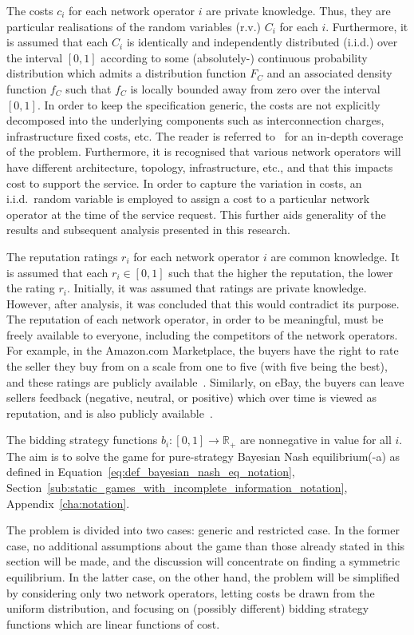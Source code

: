 The costs $c_i$ for each network operator $i$ are private knowledge. Thus, they are particular realisations of the random variables (r.v.) $C_i$ for each $i$. Furthermore, it is assumed that each $C_i$ is identically and independently distributed (i.i.d.) over the interval $[0,1]$ according to some (absolutely-) continuous probability distribution which admits a distribution function $F_{C}$ and an associated density function $f_{C}$ such that $f_C$ is locally bounded away from zero over the interval $[0,1]$. In order to keep the specification generic, the costs are not explicitly decomposed into the underlying components such as interconnection charges, infrastructure fixed costs, etc. The reader is referred to~\cite{Njoroge2009,LeCadre2009,HauBrenner2009} for an in-depth coverage of the problem. Furthermore, it is recognised that various network operators will have different architecture, topology, infrastructure, etc., and that this impacts cost to support the service. In order to capture the variation in costs, an i.i.d.~random variable is employed to assign a cost to a particular network operator at the time of the service request. This further aids generality of the results and subsequent analysis presented in this research.

The reputation ratings $r_i$ for each network operator $i$ are common knowledge. It is assumed that each $r_i\in [0,1]$ such that the higher the reputation, the lower the rating $r_i$. Initially, it was assumed that ratings are private knowledge. However, after analysis, it was concluded that this would contradict its purpose. The reputation of each network operator, in order to be meaningful, must be freely available to everyone, including the competitors of the network operators. For example, in the Amazon.com Marketplace, the buyers have the right to rate the seller they buy from on a scale from one to five (with five being the best), and these ratings are publicly available~\cite{AMAZON}. Similarly, on eBay, the buyers can leave sellers feedback (negative, neutral, or positive) which over time is viewed as reputation, and is also publicly available~\cite{EBAY}.
	
The bidding strategy functions $b_i: [0,1]\to\mathbb{R_+}$ are nonnegative in value for all $i$. The aim is to solve the game for pure-strategy Bayesian Nash equilibrium(-a) as defined in Equation~\eqref{eq:def_bayesian_nash_eq_notation}, Section~\ref{sub:static_games_with_incomplete_information_notation}, Appendix~\ref{cha:notation}.

The problem is divided into two cases: generic and restricted case. In the former case, no additional assumptions about the game than those already stated in this section will be made, and the discussion will concentrate on finding a symmetric equilibrium. In the latter case, on the other hand, the problem will be simplified by considering only two network operators, letting costs be drawn from the uniform distribution, and focusing on (possibly different) bidding strategy functions which are linear functions of cost.

